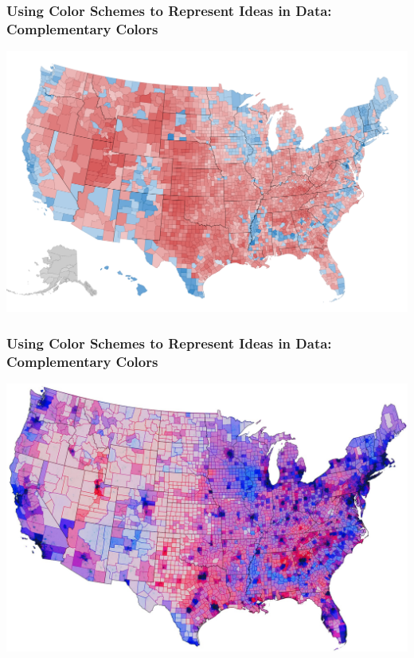 \documentclass{beamer} %
\begin{document}
\begin{frame}\frametitle{Using Color Schemes to Represent Ideas in Data:  Complementary Colors}
	\centering
	
	\includegraphics[width=0.81\linewidth]{election.png}
	
\end{frame}


\begin{frame}\frametitle{Using Color Schemes to Represent Ideas in Data:  Complementary Colors}
	\centering
	
	\includegraphics[width=0.81\linewidth]{election.jpg}
	
\end{frame}
\end{document}

